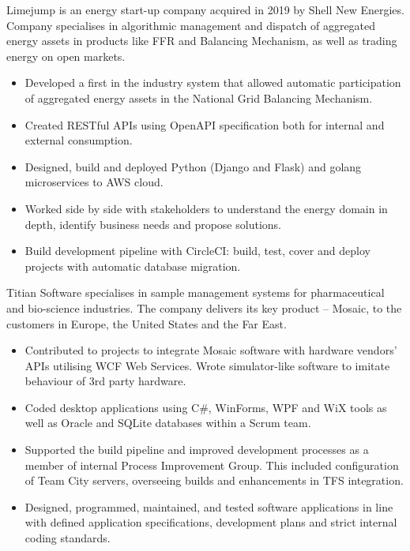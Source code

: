 \documentclass[12pt,english]{resume}
\begin{document}
		Limejump is an energy start-up company acquired in 2019 by Shell New Energies. Company specialises in algorithmic management and dispatch of aggregated energy assets in products like FFR and Balancing Mechanism, as well as trading energy on open markets.
		
		\begin{itemize}
			\item Developed a first in the industry system that allowed automatic participation of aggregated energy assets in the National Grid Balancing Mechanism.
			\item Created RESTful APIs using OpenAPI specification both for internal and external consumption.
			\item Designed, build and deployed Python (Django and Flask) and golang microservices to AWS cloud.
			\item Worked side by side with stakeholders to understand the energy domain in depth, identify business needs and propose solutions.
			\item Build development pipeline with CircleCI: build, test, cover and deploy projects with automatic database migration.
		\end{itemize}
				
		Titian Software specialises in sample management systems for pharmaceutical and bio-science industries. The company delivers its key product – Mosaic, to the customers in Europe, the United States and the Far East.
		\begin{itemize}
			\item Contributed to projects to integrate Mosaic software with hardware vendors’ APIs utilising WCF Web Services. Wrote simulator-like software to imitate behaviour of 3rd party hardware.
			\item Coded desktop applications using C\#, WinForms, WPF and WiX tools as well as Oracle and SQLite databases within a Scrum team.
			\item Supported the build pipeline and improved development processes as a member of internal Process Improvement Group. This included configuration of Team City servers, overseeing builds and enhancements in TFS integration.
			\item Designed, programmed, maintained, and tested software applications in line with defined application specifications, development plans and strict internal coding standards.
		\end{itemize}
		
\end{document}
